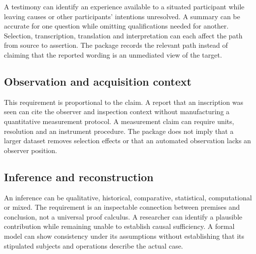 \documentclass[11pt,a4paper]{article}
\begin{document}
A testimony can identify an experience available to a situated participant while leaving causes or other participants' intentions unresolved. A summary can be accurate for one question while omitting qualifications needed for another. Selection, transcription, translation and interpretation can each affect the path from source to assertion. The package records the relevant path instead of claiming that the reported wording is an unmediated view of the target.

\subsection{Observation and acquisition context}

This requirement is proportional to the claim. A report that an inscription was seen can cite the observer and inspection context without manufacturing a quantitative measurement protocol. A measurement claim can require units, resolution and an instrument procedure. The package does not imply that a larger dataset removes selection effects or that an automated observation lacks an observer position.

\subsection{Inference and reconstruction}

An inference can be qualitative, historical, comparative, statistical, computational or mixed. The requirement is an inspectable connection between premises and conclusion, not a universal proof calculus. A researcher can identify a plausible contribution while remaining unable to establish causal sufficiency. A formal model can show consistency under its assumptions without establishing that its stipulated subjects and operations describe the actual case.
\end{document}
